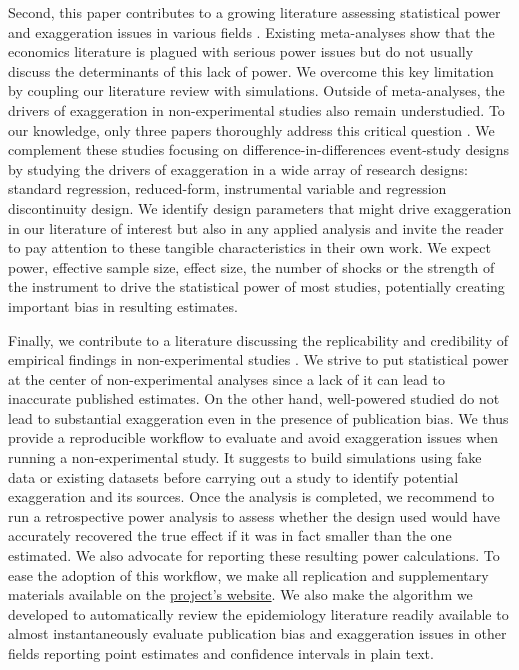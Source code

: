 \documentclass[12pt]{article}
\begin{document}
    Second, this paper contributes to a growing literature assessing statistical power and exaggeration issues in various fields \citep{ioannidis_why_2008, gelman_beyond_2014, ioannidis_power_2017, ferraro_featureis_2020, stommes2021reliability, arel_bundock_quantitative_2022}. Existing meta-analyses show that the economics literature is plagued with serious power issues but do not usually discuss the determinants of this lack of power. We overcome this key limitation by coupling our literature review with simulations. Outside of meta-analyses, the drivers of exaggeration in non-experimental studies also remain understudied. To our knowledge, only three papers thoroughly address this critical question \citep{schell_evaluating_2018, griffin_moving_2021, black_simulated_2022}. We complement these studies focusing on difference-in-differences event-study designs by studying the drivers of exaggeration in a wide array of research designs: standard regression, reduced-form, instrumental variable and regression discontinuity design. We identify design parameters that might drive exaggeration in our literature of interest but also in any applied analysis and invite the reader to pay attention to these tangible characteristics in their own work. We expect power, effective sample size, effect size, the number of shocks or the strength of the instrument to drive the statistical power of most studies, potentially creating important bias in resulting estimates. 

    Finally, we contribute to a literature discussing the replicability and credibility of empirical findings in non-experimental studies \citep[for instance]{button_power_2013, open_science_collaboration_estimating_2015, camerer_evaluating_2018, brodeur_methods_2020}. We strive to put statistical power at the center of non-experimental analyses since a lack of it can lead to inaccurate published estimates. On the other hand, well-powered studied do not lead to substantial exaggeration even in the presence of publication bias. We thus provide a reproducible workflow to evaluate and avoid exaggeration issues when running a non-experimental study. It suggests to build simulations using fake data or existing datasets before carrying out a study to identify potential exaggeration and its sources. Once the analysis is completed, we recommend to run a retrospective power analysis to assess whether the design used would have accurately recovered the true effect if it was in fact smaller than the one estimated. We also advocate for reporting these resulting power calculations.
    To ease the adoption of this workflow, we make all replication and supplementary materials available on the \href{https://vincentbagilet.github.io/inference_pollution/}{project's website}. We also make the algorithm we developed to automatically review the epidemiology literature readily available to almost instantaneously evaluate publication bias and exaggeration issues in other fields reporting point estimates and confidence intervals in plain text.
\end{document}
